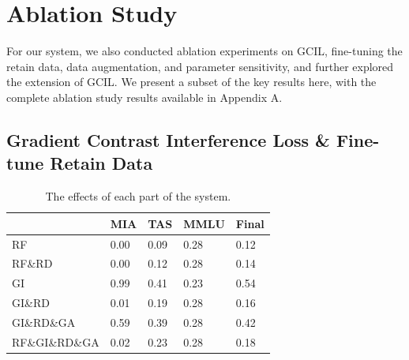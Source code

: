 \documentclass[11pt]{article}
\begin{document}
\section{Ablation Study}
\label{sec:Ablation}

For our system, we also conducted ablation experiments on GCIL, fine-tuning the retain data, data augmentation, and parameter sensitivity, and further explored the extension of GCIL. We present a subset of the key results here, with the complete ablation study results available in Appendix A.

\subsection{Gradient Contrast Interference Loss \& Fine-tune Retain Data} 

\begin{table}[h]\footnotesize
  \centering
    \begin{tabular}{l|l|l|l|l}
    \hline
        ~ & MIA & TAS & MMLU & Final \\ \hline
        RF & 0.00 & 0.09 & 0.28 & 0.12 \\ \hline
        RF\&RD & 0.00 & 0.12 & 0.28 & 0.14 \\ \hline
        GI & 0.99 & 0.41 & 0.23 & 0.54 \\ \hline
        GI\&RD & 0.01 & 0.19 & 0.28 & 0.16 \\ \hline
        GI\&RD\&GA & 0.59 & 0.39 & 0.28 & 0.42 \\ \hline
        RF\&GI\&RD\&GA & 0.02 & 0.23 & 0.28 & 0.18 \\ \hline
    \end{tabular}
  \caption{The effects of each part of the system.}
  \label{tab:accents}
\end{table}
\end{document}

